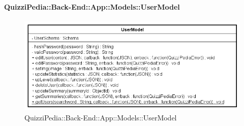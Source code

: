 \paragraph{QuizziPedia::Back-End::App::Models::UserModel}
\label{QuizziPedia::Back-End::App::Models::UserModel}
\begin{figure}[ht]
	\centering
	\includegraphics[scale=0.7]{UML/Classi/Back-End/QuizziPedia_Back-End_App_Models_userModel.png}
	\caption{QuizziPedia::Back-End::App::Models::UserModel}
\end{figure}
\FloatBarrier
